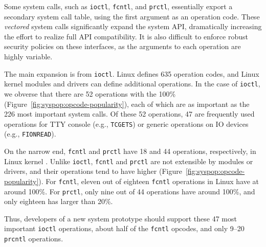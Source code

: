 Some system calls, such as {\tt ioctl}, {\tt fcntl},
and {\tt prctl}, essentially export a secondary system call table, 
using the first argument as an operation code.
These {\it vectored} system calls significantly expand the system API, 
dramatically increasing the effort to realize full API compatibility.
It is also difficult to enforce robust security policies on these interfaces,
as the arguments to each operation are highly variable.


The main expansion is from {\tt ioctl}.
Linux defines 635 operation codes, and 
Linux kernel modules and drivers can define additional operations.
In the case of {\tt ioctl}, we obverse that there are 52 operations with the 100\% \usagemetric{} (Figure~\ref{fig:syspop:opcode-popularity}),
each of which are as important as the 226 most important system calls.
Of these 52 operations,  47 are frequently used operations for TTY console (e.g., {\tt TCGETS}) or generic operations on IO devices (e.g., {\tt FIONREAD}).




On the narrow end, {\tt fcntl} and {\tt prctl} have 18 and 44 operations, respectively, in Linux kernel .
Unlike {\tt ioctl}, {\tt fcntl} and {\tt prctl} are not extensible by modules or drivers,
and their operations tend to have higher \usagemetric{} (Figure~\ref{fig:syspop:opcode-popularity}).
For {\tt fcntl}, eleven out of eighteen {\tt fcntl} operations in Linux  have \usagemetric{} at around 100\%.
For {\tt prctl}, only nine out of 44 operations have \usagemetric{} around 100\%,
and only eighteen has \usagemetric{} larger than 20\%.


Thus, developers of a new system prototype should support these 47 most important {\tt ioctl}
operations, about half of the {\tt fcntl} opcodes, and only 9--20 {\tt prcntl} operations.



